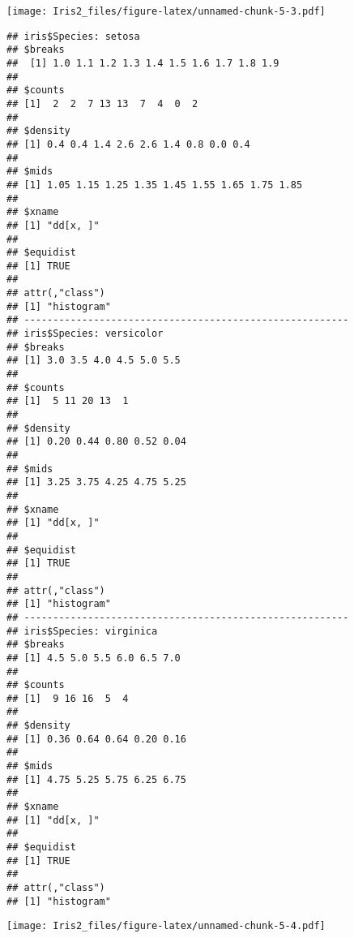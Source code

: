 \documentclass[]{article}
\newenvironment{Shaded}{\begin{snugshade}}{\end{snugshade}}
\newcommand{\KeywordTok}[1]{\textcolor[rgb]{0.13,0.29,0.53}{\textbf{#1}}}
\newcommand{\DataTypeTok}[1]{\textcolor[rgb]{0.13,0.29,0.53}{#1}}
\newcommand{\StringTok}[1]{\textcolor[rgb]{0.31,0.60,0.02}{#1}}
\newcommand{\OperatorTok}[1]{\textcolor[rgb]{0.81,0.36,0.00}{\textbf{#1}}}
\newcommand{\NormalTok}[1]{#1}
\begin{document}
\begin{Shaded}
\end{Shaded}

\texttt{[image: Iris2\_files/figure-latex/unnamed-chunk-5-3.pdf]}

\begin{verbatim}
## iris$Species: setosa
## $breaks
##  [1] 1.0 1.1 1.2 1.3 1.4 1.5 1.6 1.7 1.8 1.9
## 
## $counts
## [1]  2  2  7 13 13  7  4  0  2
## 
## $density
## [1] 0.4 0.4 1.4 2.6 2.6 1.4 0.8 0.0 0.4
## 
## $mids
## [1] 1.05 1.15 1.25 1.35 1.45 1.55 1.65 1.75 1.85
## 
## $xname
## [1] "dd[x, ]"
## 
## $equidist
## [1] TRUE
## 
## attr(,"class")
## [1] "histogram"
## -------------------------------------------------------- 
## iris$Species: versicolor
## $breaks
## [1] 3.0 3.5 4.0 4.5 5.0 5.5
## 
## $counts
## [1]  5 11 20 13  1
## 
## $density
## [1] 0.20 0.44 0.80 0.52 0.04
## 
## $mids
## [1] 3.25 3.75 4.25 4.75 5.25
## 
## $xname
## [1] "dd[x, ]"
## 
## $equidist
## [1] TRUE
## 
## attr(,"class")
## [1] "histogram"
## -------------------------------------------------------- 
## iris$Species: virginica
## $breaks
## [1] 4.5 5.0 5.5 6.0 6.5 7.0
## 
## $counts
## [1]  9 16 16  5  4
## 
## $density
## [1] 0.36 0.64 0.64 0.20 0.16
## 
## $mids
## [1] 4.75 5.25 5.75 6.25 6.75
## 
## $xname
## [1] "dd[x, ]"
## 
## $equidist
## [1] TRUE
## 
## attr(,"class")
## [1] "histogram"
\end{verbatim}

\begin{Shaded}
\end{Shaded}

\texttt{[image: Iris2\_files/figure-latex/unnamed-chunk-5-4.pdf]}
\end{document}
